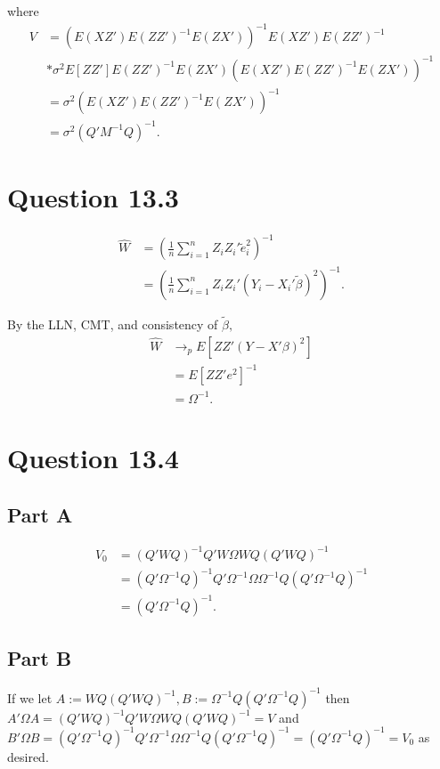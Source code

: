 \documentclass[11pt]{article} %
\begin{document}
where 
\begin{align*}
V &= \left( E\left( XZ'\right)E\left(ZZ'\right)^{-1}E\left(ZX'\right)\right)^{-1}E\left(XZ'\right)E\left(ZZ'\right)^{-1} \\&*\sigma^2E[ZZ']E\left(ZZ'\right)^{-1}E\left(ZX'\right)\left( E\left( XZ'\right)E\left(ZZ'\right)^{-1}E\left(ZX'\right)\right)^{-1}\\
&= \sigma^2 \left( E\left( XZ'\right)E\left(ZZ'\right)^{-1}E\left(ZX'\right)\right)^{-1} \\
&= \sigma^2(Q'M^{-1}Q)^{-1}.
\end{align*}

\section{Question 13.3}

\begin{align*}
\hat{W} &= \left(\frac{1}{n} \sum_{i=1}^n Z_i Z_i'\tilde{e}_i^2 \right)^{-1}\\
&= \left(\frac{1}{n} \sum_{i=1}^n Z_i Z_i'(Y_i - X_i'\tilde{\beta})^2 \right)^{-1}.
\end{align*}

By the LLN, CMT, and consistency of $\tilde{\beta},$
\begin{align*}
\hat{W} &\rightarrow_p E[ZZ'(Y-X'\beta)^2]\\
&= E[ZZ'e^2]^{-1}\\
&= \Omega^{-1}.
\end{align*}
\section{Question 13.4}
\subsection{Part A}
\begin{align*}
V_0 &= (Q'WQ)^{-1}Q'W\Omega WQ(Q'WQ)^{-1}\\
&= (Q'\Omega^{-1}Q)^{-1}Q'\Omega^{-1}\Omega \Omega^{-1}Q(Q'\Omega^{-1}Q)^{-1}\\
&= (Q'\Omega^{-1}Q)^{-1}.
\end{align*}

\subsection{Part B}
If we let $A := WQ(Q'WQ)^{-1}, B:= \Omega^{-1}Q(Q'\Omega^{-1}Q)^{-1}$ then $A'\Omega A = (Q'WQ)^{-1}Q'W\Omega WQ(Q'WQ)^{-1} = V$ and $B'\Omega B  = (Q'\Omega^{-1}Q)^{-1}Q' \Omega^{-1}\Omega \Omega^{-1} Q (Q'\Omega^{-1}Q)^{-1} = (Q'\Omega^{-1}Q)^{-1} = V_0$ as desired.
\end{document}
